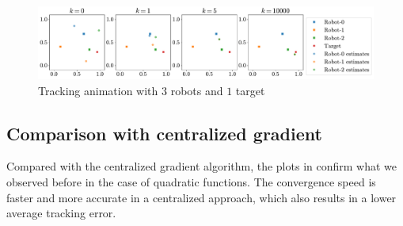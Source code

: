 \documentclass[a4paper,11pt,oneside]{book}
\begin{document}
\begin{figure}[tb!]
      \centering
      \includegraphics[width=\linewidth]{./figs/tracking/anim.pdf} 
      \caption{Tracking animation with $3$ robots and $1$ target}
      \label{fig:tracking_animation}
\end{figure}


\subsection{Comparison with centralized gradient}

Compared with the centralized gradient algorithm, the plots in  confirm what we observed before in the case of quadratic functions. The convergence speed is faster and more accurate in a centralized approach, which also results in a lower average tracking error.
\end{document}
